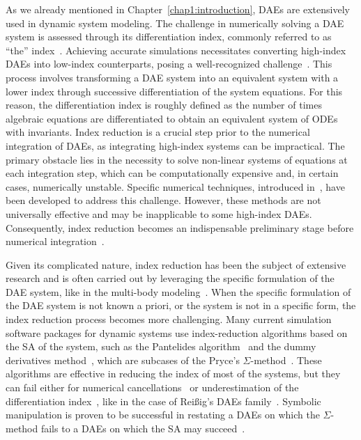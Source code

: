 As we already mentioned in Chapter~\ref{chap1:introduction}, \acp{DAE} are extensively used in dynamic system modeling. The challenge in numerically solving a \ac{DAE} system is assessed through its differentiation index, commonly referred to as ``the'' index~\cite{campbell1995index, campbell1995highindex}. Achieving accurate simulations necessitates converting high-index \acp{DAE} into low-index counterparts, posing a well-recognized challenge~\cite{petzold1982differential}. This process involves transforming a \ac{DAE} system into an equivalent system with a lower index through successive differentiation of the system equations. For this reason, the differentiation index is roughly defined as the number of times algebraic equations are differentiated to obtain an equivalent system of \acp{ODE} with invariants. Index reduction is a crucial step prior to the numerical integration of \acp{DAE}, as integrating high-index systems can be impractical. The primary obstacle lies in the necessity to solve non-linear systems of equations at each integration step, which can be computationally expensive and, in certain cases, numerically unstable. Specific numerical techniques, introduced in~\cite{petzold1982differential, thomsen1999numerical, baumgarte1972stabilization}, have been developed to address this challenge. However, these methods are not universally effective and may be inapplicable to some high-index \acp{DAE}. Consequently, index reduction becomes an indispensable preliminary stage before numerical integration~\cite{lamour2013differential}.

Given its complicated nature, index reduction has been the subject of extensive research and is often carried out by leveraging the specific formulation of the \ac{DAE} system, like in the multi-body modeling~\cite{zhou2005implicit, zhou2007symbolic, zhou2007symbolicseq, bayo1988modified, wehage1982generalized}. When the specific formulation of the \ac{DAE} system is not known a priori, or the system is not in a specific form, the index reduction process becomes more challenging. Many current simulation software packages for dynamic systems use index-reduction algorithms based on the \ac{SA} of the system, such as the Pantelides algorithm~\cite{pantelides1988consistent} and the dummy derivatives method~\cite{mattsson1993index}, which are subcases of the Pryce's $\Sigma$-method~\cite{pryce1998solving, pryce2001simple, nedialkov2007solvingI, nedialkov2007solvingII, nedialkov2008solvingIII, nedialkov2015algorithm, tan2016symbolic, mckenzie2017structural}. These algorithms are effective in reducing the index of most of the systems, but they can fail either for numerical cancellations~\cite{iwata2019index} or underestimation of the differentiation index~\cite{pantelides1988consistent, unger1995structural}, like in the case of Rei{\ss}ig's \acp{DAE} family~\cite{reissig2000differential}. Symbolic manipulation is proven to be successful in restating a \acp{DAE} on which the $\Sigma$-method fails to a \acp{DAE} on which the \ac{SA} may succeed~\cite{tan2016symbolic}.

